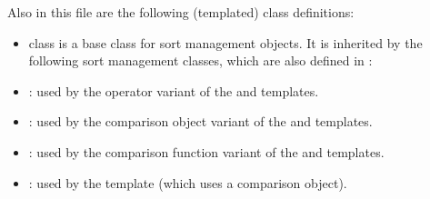    Also in this file are the following (templated) class definitions:

    \begin{itemize}
        
        \item class  is a base class for
        sort management objects. It is inherited by the
        following sort management classes, which are also
        defined in :

        \item {}: used by the operator
        variant of the  and  templates.
        
        \item {}: used by the
        comparison object variant of the 
        and  templates.
        
        \item {}: used by the
        comparison function variant of the  and
         templates.

%
        
        \item {}: used by the
         template (which uses a
        comparison object).
    \end{itemize}

